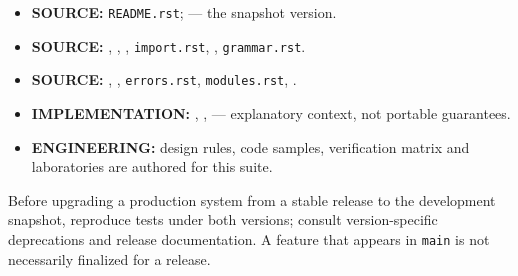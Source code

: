 \documentclass[
  11pt,
]{report}
\newcommand{\passthrough}[1]{#1}
\providecommand{\tightlist}{%
  \setlength{\itemsep}{0pt}\setlength{\parskip}{0pt}}
\begin{document}
\begin{itemize}
\tightlist
\item
  \textbf{SOURCE:} \passthrough{\lstinline!README.rst!};
   --- the snapshot
  version.
\item
  \textbf{SOURCE:}
  ,
  ,
  ,
  \passthrough{\lstinline!import.rst!},
  ,
  \passthrough{\lstinline!grammar.rst!}.
\item
  \textbf{SOURCE:} ,
  ,
  \passthrough{\lstinline!errors.rst!},
  \passthrough{\lstinline!modules.rst!},
  .
\item
  \textbf{IMPLEMENTATION:}
  ,
  ,
   --- explanatory
  context, not portable guarantees.
\item
  \textbf{ENGINEERING:} design rules, code samples, verification matrix
  and laboratories are authored for this suite.
\end{itemize}

Before upgrading a production system from a stable release to the
development snapshot, reproduce tests under both versions; consult
version-specific deprecations and release documentation. A feature that
appears in \passthrough{\lstinline!main!} is not necessarily finalized
for a release.
\end{document}

